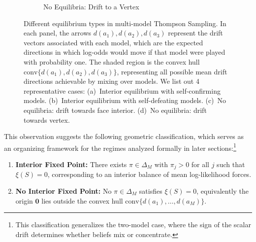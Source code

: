 \documentclass[12pt]{article}
\begin{document}
\begin{figure}[htbp]
\begin{subfigure}[b]{0.45\textwidth}
\caption{No Equilibria: Drift to a Vertex}
\label{fig:no_equilibrium_vertex}
\end{subfigure}

\caption{Different equilibrium types in multi-model Thompson Sampling. In each panel, the arrows $d(a_1), d(a_2), d(a_3)$ represent the drift vectors associated with each model, which are the expected directions in which log-odds would move if that model were played with probability one. The shaded region is the convex hull $\mathrm{conv}\{d(a_1), d(a_2), d(a_3)\}$, representing all possible mean drift directions achievable by mixing over models. We list out 4 representative cases:  (a)~Interior equilibrium with self-confirming models. (b)~Interior equilibrium with self-defeating models. (c)~No equilibria: drift towards face interior. (d)~No equilibria: drift towards vertex.}
\label{fig:equilibria_types}
\end{figure}

This observation suggests the following geometric classification, which serves as an organizing framework for the regimes analyzed formally in later sections:\footnote{This classification generalizes the two-model case, where the sign of the scalar drift determines whether beliefs mix or concentrate.}

\begin{enumerate}
    \item \textbf{Interior Fixed Point:} There exists $\pi\in\Delta_M$ with $\pi_j>0$ for all $j$ such that $\xi(S)=0$, corresponding to an interior balance of mean log-likelihood forces.
    \item \textbf{No Interior Fixed Point:} No $\pi\in\Delta_M$ satisfies $\xi(S)=0$, equivalently the origin $\mathbf{0}$ lies outside the convex hull $\mathrm{conv}\{d(a_1),\ldots,d(a_M)\}$.
\end{enumerate}
\end{document}
